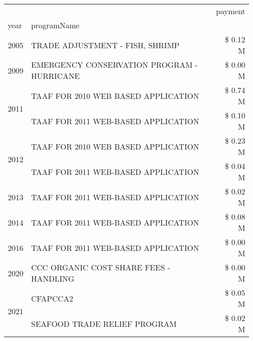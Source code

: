 \begin{tabular}{llr}
\toprule
 &  & payment \\
year & programName &  \\
\midrule
2005 & TRADE ADJUSTMENT - FISH, SHRIMP & \$ 0.12 M \\
\cline{1-3}
2009 & EMERGENCY CONSERVATION PROGRAM - HURRICANE & \$ 0.00 M \\
\cline{1-3}
\multirow[t]{2}{*}{2011} & TAAF FOR 2010 WEB BASED APPLICATION & \$ 0.74 M \\
 & TAAF FOR 2011 WEB-BASED APPLICATION & \$ 0.10 M \\
\cline{1-3}
\multirow[t]{2}{*}{2012} & TAAF FOR 2010 WEB BASED APPLICATION & \$ 0.23 M \\
 & TAAF FOR 2011 WEB-BASED APPLICATION & \$ 0.04 M \\
\cline{1-3}
2013 & TAAF FOR 2011 WEB-BASED APPLICATION & \$ 0.02 M \\
\cline{1-3}
2014 & TAAF FOR 2011 WEB-BASED APPLICATION & \$ 0.08 M \\
\cline{1-3}
2016 & TAAF FOR 2011 WEB-BASED APPLICATION & \$ 0.00 M \\
\cline{1-3}
2020 & CCC ORGANIC COST SHARE FEES - HANDLING & \$ 0.00 M \\
\cline{1-3}
\multirow[t]{2}{*}{2021} & CFAPCCA2 & \$ 0.05 M \\
 & SEAFOOD TRADE RELIEF PROGRAM & \$ 0.02 M \\
\cline{1-3}
\bottomrule
\end{tabular}
